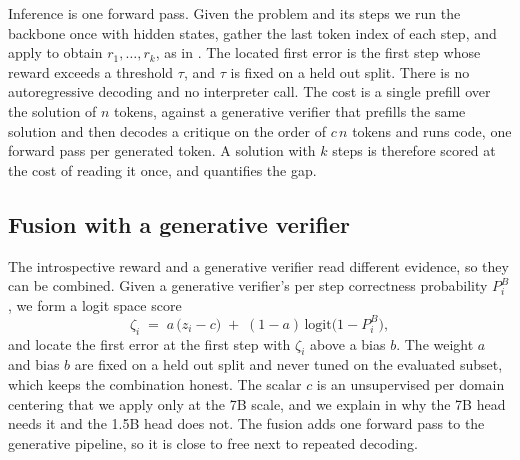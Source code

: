 Inference is one forward pass. Given the problem and its steps we run the backbone once with hidden states, gather the last token index of each step, and apply  to obtain $r_1,\dots,r_k$, as in . The located first error is the first step whose reward exceeds a threshold $\tau$, and $\tau$ is fixed on a held out split. There is no autoregressive decoding and no interpreter call. The cost is a single prefill over the solution of $n$ tokens, against a generative verifier that prefills the same solution and then decodes a critique on the order of $c\,n$ tokens and runs code, one forward pass per generated token. A solution with $k$ steps is therefore scored at the cost of reading it once, and  quantifies the gap.

\subsection{Fusion with a generative verifier}
\label{sec:method-fusion}

The introspective reward and a generative verifier read different evidence, so they can be combined. Given a generative verifier's per step correctness probability $P^{B}_i$, we form a logit space score
\begin{equation}
  \zeta_i \;=\; a\,\big(z_i - c\big) \;+\; (1-a)\,\mathrm{logit}\big(1 - P^{B}_i\big),
  \label{eq:fusion}
\end{equation}
and locate the first error at the first step with $\zeta_i$ above a bias $b$. The weight $a$ and bias $b$ are fixed on a held out split and never tuned on the evaluated subset, which keeps the combination honest. The scalar $c$ is an unsupervised per domain centering that we apply only at the 7B scale, and we explain in  why the 7B head needs it and the 1.5B head does not. The fusion adds one forward pass to the generative pipeline, so it is close to free next to repeated decoding.
